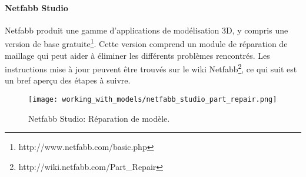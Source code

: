 
\paragraph{Netfabb Studio} %
\label{par:netfabb_studio}
Netfabb produit une gamme d'applications de modélisation 3D, y compris une version de base gratuite\footnote{http://www.netfabb.com/basic.php}.  Cette version comprend un module de réparation de maillage qui peut aider à éliminer les différents problèmes rencontrés. Les instructions mise à jour peuvent être trouvés sur le wiki Netfabb\footnote{http://wiki.netfabb.com/Part\_Repair}, ce qui suit est un bref aperçu des étapes à suivre.

\begin{figure}[H]
\centering
\texttt{[image: working\_with\_models/netfabb\_studio\_part\_repair.png]}
\caption{Netfabb Studio: Réparation de modèle.}
\label{fig:netfabb_studio_part_repair}
\end{figure}

